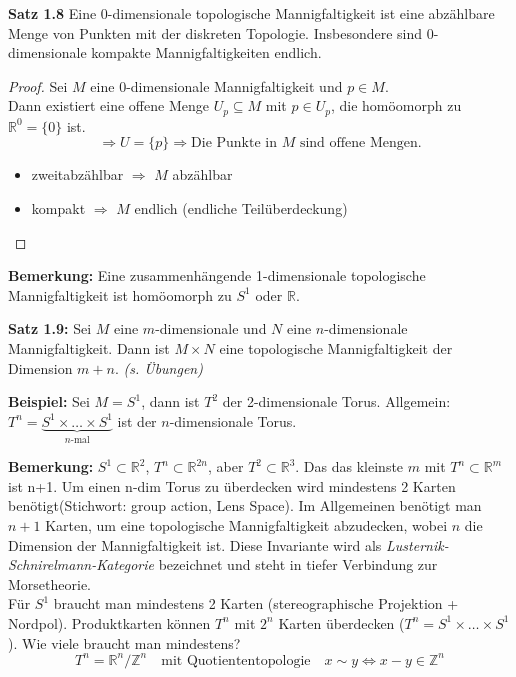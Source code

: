 \documentclass[fleqn, 12pt, letterpaper]{article}
\begin{document}
\medskip

\textbf{Satz 1.8} Eine 0-dimensionale topologische Mannigfaltigkeit ist eine abzählbare Menge von Punkten mit der diskreten Topologie. Insbesondere sind 0-dimensionale kompakte Mannigfaltigkeiten endlich.
\begin{proof}
	Sei $M$ eine 0-dimensionale Mannigfaltigkeit und $p \in M$.\\
    Dann existiert eine offene Menge $U_p \subseteq M$ mit $p \in U_p$, die homöomorph zu $\mathbb{R}^0 = \{0\}$ ist.
    \[
    \Rightarrow U = \{p\} \Rightarrow \text{Die Punkte in } M \text    { sind offene Mengen.}
    \]
    \begin{itemize}[label={--}]
      \item zweitabzählbar $\Rightarrow$ $M$ abzählbar
      \item kompakt $\Rightarrow$ $M$ endlich (endliche Teilüberdeckung)
    \end{itemize}
\end{proof}

\textbf{Bemerkung:} Eine zusammenhängende 1-dimensionale topologische Mannigfaltigkeit ist homöomorph zu $S^1$ oder $\mathbb{R}$.

\medskip

\textbf{Satz 1.9:} Sei $M$ eine $m$-dimensionale und $N$ eine $n$-dimensionale Mannigfaltigkeit. Dann ist $M \times N$ eine topologische Mannigfaltigkeit der Dimension $m+n$. \textit{(s. Übungen)}

\medskip

\textbf{Beispiel:} Sei $M = S^1$, dann ist $T^2$ der 2-dimensionale Torus. Allgemein: $T^n = \underbrace{S^1 \times \ldots \times S^1}_{n\text{-mal}}$ ist der $n$-dimensionale Torus.

\textbf{Bemerkung:} $S^1 \subset \mathbb{R}^2$, $T^n \subset \mathbb{R}^{2n}$, aber $T^2 \subset \mathbb{R}^3$. Das das kleinste $m$ mit $T^n \subset \mathbb{R}^m$ ist n+1. Um einen n-dim Torus zu überdecken wird mindestens 2 Karten benötigt(Stichwort: group action, Lens Space). Im Allgemeinen benötigt man $n+1$ Karten, um eine topologische Mannigfaltigkeit abzudecken, wobei $n$ die Dimension der Mannigfaltigkeit ist. Diese Invariante wird als \textit{Lusternik-Schnirelmann-Kategorie} bezeichnet und steht in tiefer Verbindung zur Morsetheorie.\\

Für $S^1$ braucht man mindestens 2 Karten (stereographische Projektion + Nordpol).
Produktkarten können $T^n$ mit $2^n$ Karten überdecken ($T^n=S^1\times\dots\times S^1$). Wie viele braucht man mindestens?
\[
T^n = \mathbb{R}^n / \mathbb{Z}^n \quad \text{mit Quotiententopologie}
\quad x \sim y \Leftrightarrow x - y \in \mathbb{Z}^n
\]
\end{document}
